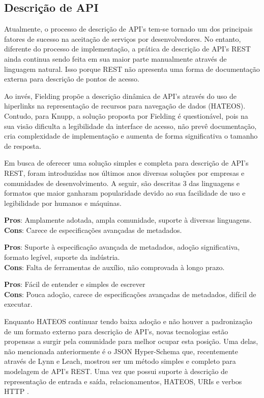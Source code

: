 \subsection[Descrição de API]{Descrição de API}

Atualmente, o processo de descrição de API's tem-se tornado um dos principais fatores de sucesso na aceitação de serviços por desenvolvedores. No entanto, diferente do processo de implementação, a prática de descrição de API's REST ainda continua sendo feita em sua maior parte manualmente através de linguagem natural. Isso porque REST não apresenta uma forma de documentação externa para descrição de pontos de acesso. \cite{LuckyEtAl2016}
 
Ao invés, Fielding propõe a descrição dinâmica de API's através do uso de hiperlinks na representação de recursos para navegação de dados (HATEOS). Contudo, para Knupp, a solução proposta por Fielding é questionável, pois na sua visão dificulta a legibilidade da interface de acesso, não prevê documentação, cria complexidade de implementação e aumenta de forma significativa o tamanho de resposta. \cite{Knupp2016}

Em busca de oferecer uma solução simples e completa para descrição de API's REST, foram introduzidas nos últimos anos diversas soluções por empresas e comunidades de desenvolvimento. A seguir, são descritas 3 das linguagens e formatos que maior ganharam popularidade devido ao sua facilidade de uso e legibilidade por humanos e máquinas. \cite{Sandoval2015}
 
\begin{description}[leftmargin=8em,style=nextline]
  \item[\textbf{OpenAPI}] \textbf{Pros}: Amplamente adotada, ampla comunidade, suporte à diversas linguagens. \\ \textbf{Cons}: Carece de especificações avançadas de metadados.
  \item[\textbf{RAML}] \textbf{Pros}: Suporte à especificação avançada de metadados, adoção significativa, formato legível, suporte da indústria. \\ \textbf{Cons}: Falta de ferramentas de auxílio, não comprovada à longo prazo.
  \item[\textbf{API Blueprint}] \textbf{Pros}: Fácil de entender e simples de escrever \\ \textbf{Cons}: Pouca adoção, carece de especificações avançadas de metadados, difícil de executar.
\end{description}

Enquanto HATEOS continuar tendo baixa adoção e não houver a padronização de um formato externo para descrição de API's, novas tecnologias estão propensas a surgir pela comunidade para melhor ocupar esta posição. Uma delas, não mencionada anteriormente é o JSON Hyper-Schema que, recentemente através de Lynn e Leach, mostrou ser um método simples e completo para modelagem de API's REST. Uma vez que possui suporte à descrição de representação de entrada e saída, relacionamentos, HATEOS, URIs e verbos HTTP  \cite{LynnEtAl2016} \cite{Leach2014}.
